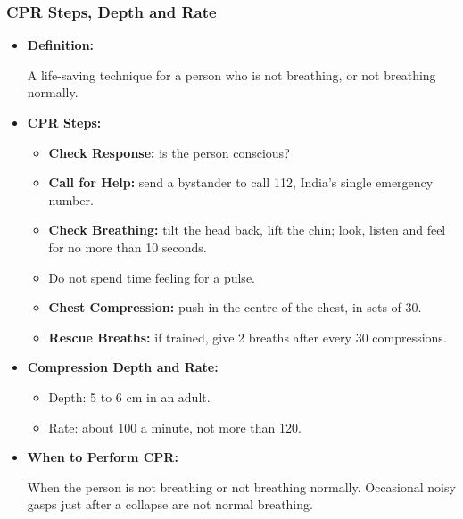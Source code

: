 \begin{frame}[fragile,shrink=6]\frametitle{CPR Steps, Depth and Rate}

      \begin{itemize}
        \item \textbf{Definition:} 
        
        A life-saving technique for a person who is not breathing, or not breathing normally.

        \item \textbf{CPR Steps:}
        \begin{itemize}
            \item \textbf{Check Response:} is the person conscious?
            \item \textbf{Call for Help:} send a bystander to call 112, India's single emergency number.
            \item \textbf{Check Breathing:} tilt the head back, lift the chin; look, listen and feel for no more than 10 seconds.
            \item Do not spend time feeling for a pulse.
            \item \textbf{Chest Compression:} push in the centre of the chest, in sets of 30.
            \item \textbf{Rescue Breaths:} if trained, give 2 breaths after every 30 compressions.
        \end{itemize}
        \item \textbf{Compression Depth and Rate:}
        \begin{itemize}
            \item Depth: 5 to 6 cm in an adult.
            \item Rate: about 100 a minute, not more than 120.
        \end{itemize}
        \item \textbf{When to Perform CPR:}

        When the person is not breathing or not breathing normally. Occasional noisy gasps just after a collapse are not normal breathing.

      \end{itemize}

\end{frame}

